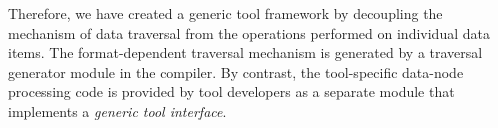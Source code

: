 
Therefore, we have created a generic tool framework by decoupling the
mechanism of data traversal from the operations performed on
individual data items. The format-dependent traversal mechanism is
generated by a traversal generator module in the \padsml{} compiler.
By contrast, the tool-specific data-node processing code is provided
by tool developers as a separate module that implements a
\emph{generic tool interface}.





